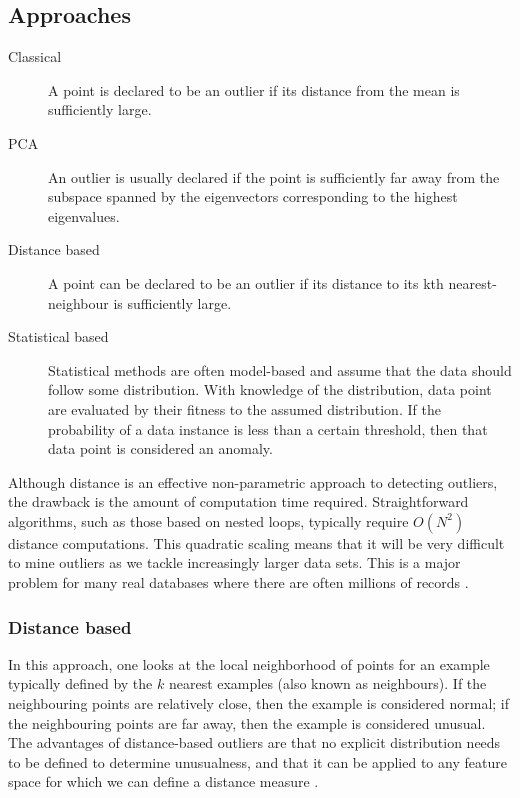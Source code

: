 \subsection{Approaches}
\label{anomalyDetection:approaches}
\begin{description}

\item[Classical] A point is declared to be an outlier if its distance from the
mean is sufficiently large.

\item[\gls{PCA}] An outlier is usually declared if the point is sufficiently far
away from the subspace spanned by the eigenvectors corresponding to the highest
eigenvalues.

\item[Distance based] A point can be declared to be an outlier if its distance
to its kth nearest-neighbour is sufficiently large.

\item[Statistical based] Statistical methods are often model-based and assume
that the data should follow some distribution. With knowledge of the
distribution, data point are evaluated by their fitness to the assumed
distribution. If the probability of a data instance is less than a certain
threshold, then that data point is considered an anomaly.

\end{description}

Although distance is an effective non-parametric approach to detecting outliers,
the drawback is the amount of computation time required. Straightforward 
algorithms, such as those based on nested loops, typically require $O(N^{2})$
distance computations. This quadratic scaling means that it will be very
difficult to mine outliers as we tackle increasingly larger data sets. This is a
major problem for many real databases where there are often millions of records
\cite{Bay:2003}.

\subsubsection{Distance based}
\label{anomalyDetection:approaches:distance}
In this approach, one looks at the local neighborhood of points for an example
typically defined by the $k$ nearest examples (also known as neighbours). If the
neighbouring points are relatively close, then the example is considered normal;
if the neighbouring points are far away, then the example is considered unusual.
The advantages of distance-based outliers are that no explicit distribution
needs to be defined to determine unusualness, and that it can be applied to any
feature space for which we can define a distance measure \cite{Bay:2003}.

